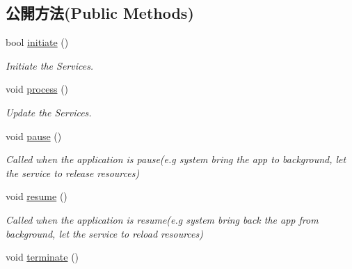 \subsection*{公開方法(Public Methods)}
\begin{DoxyCompactItemize}
\item 
bool \hyperlink{class_magnum_1_1_service_manager_a89840c485df0010566caa1d88ea7fc47}{initiate} ()
\begin{DoxyCompactList}\small\item\em Initiate the Services. \end{DoxyCompactList}\item 
void \hyperlink{class_magnum_1_1_service_manager_abcda82b9840798732a6fb299277532b3}{process} ()\hypertarget{class_magnum_1_1_service_manager_abcda82b9840798732a6fb299277532b3}{}\label{class_magnum_1_1_service_manager_abcda82b9840798732a6fb299277532b3}

\begin{DoxyCompactList}\small\item\em Update the Services. \end{DoxyCompactList}\item 
void \hyperlink{class_magnum_1_1_service_manager_a80893d8810a8c1e2846cde352997c747}{pause} ()\hypertarget{class_magnum_1_1_service_manager_a80893d8810a8c1e2846cde352997c747}{}\label{class_magnum_1_1_service_manager_a80893d8810a8c1e2846cde352997c747}

\begin{DoxyCompactList}\small\item\em Called when the application is pause(e.\+g system bring the app to background, let the service to release resources) \end{DoxyCompactList}\item 
void \hyperlink{class_magnum_1_1_service_manager_a1d3b0b448735facafbc60a5e3676ac23}{resume} ()\hypertarget{class_magnum_1_1_service_manager_a1d3b0b448735facafbc60a5e3676ac23}{}\label{class_magnum_1_1_service_manager_a1d3b0b448735facafbc60a5e3676ac23}

\begin{DoxyCompactList}\small\item\em Called when the application is resume(e.\+g system bring back the app from background, let the service to reload resources) \end{DoxyCompactList}\item 
void \hyperlink{class_magnum_1_1_service_manager_a2751316a691709f1fd94ddda9c31748c}{terminate} ()\hypertarget{class_magnum_1_1_service_manager_a2751316a691709f1fd94ddda9c31748c}{}\label{class_magnum_1_1_service_manager_a2751316a691709f1fd94ddda9c31748c}


\end{DoxyCompactItemize}
